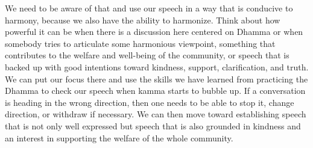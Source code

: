 We need to be aware of that and use our speech in a way that is 
conducive to harmony, because we also have the ability to harmonize. 
Think about how powerful it can be when there is a discussion here 
centered on Dhamma or when somebody tries to articulate some harmonious 
viewpoint, something that contributes to the welfare and well-being of 
the community, or speech that is backed up with good intentions toward 
kindness, support, clarification, and truth. We can put our focus there 
and use the skills we have learned from practicing the Dhamma to check 
our speech when kamma starts to bubble up. If a conversation is heading 
in the wrong direction, then one needs to be able to stop it, change 
direction, or withdraw if necessary. We can then move toward 
establishing speech that is not only well expressed but speech that is 
also grounded in kindness and an interest in supporting the welfare of 
the whole community.

